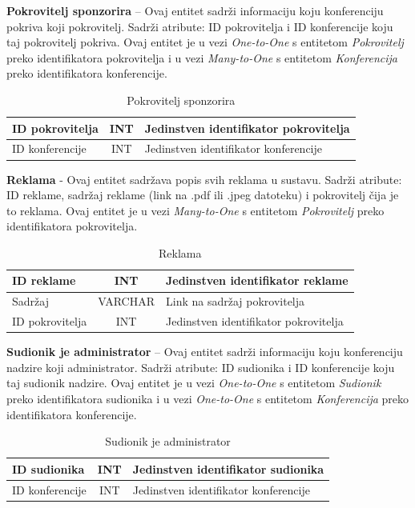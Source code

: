 \textbf{Pokrovitelj sponzorira} – Ovaj entitet sadrži informaciju koju konferenciju pokriva koji pokrovitelj. Sadrži atribute: ID pokrovitelja i ID konferencije koju taj pokrovitelj pokriva. Ovaj entitet je u vezi \textit{One-to-One} s entitetom \textit{Pokrovitelj} preko identifikatora pokrovitelja i u vezi \textit{Many-to-One} s entitetom \textit{Konferencija} preko identifikatora konferencije.

\begin{table}[H]
	\caption{Pokrovitelj sponzorira}
	\label{tbl:pokroviteljSponzorira}
	\centering
	\begin{tabular}{|l|c|l|} 
		\hline
		\cellcolor{lightblue}ID pokrovitelja & INT & Jedinstven identifikator pokrovitelja\\ 
		\hline
		\cellcolor{lightblue}ID konferencije & INT & Jedinstven identifikator konferencije\\ 
		\hline
	\end{tabular}
\end{table}

\textbf{Reklama} - Ovaj entitet sadržava popis svih reklama u sustavu. Sadrži atribute: ID reklame, sadržaj reklame (link na .pdf ili .jpeg datoteku) i pokrovitelj čija je to reklama. Ovaj entitet je u vezi \textit{Many-to-One} s entitetom \textit{Pokrovitelj} preko identifikatora pokrovitelja.

\begin{table}[H]
	\caption{Reklama}
	\label{tbl:reklama}
	\centering
	\begin{tabular}{|l|c|l|} 
		\hline
		\cellcolor{lightgreen}ID reklame & INT & Jedinstven identifikator reklame\\ 
		\hline
		Sadržaj & VARCHAR & Link na sadržaj pokrovitelja\\ 
		\hline
		\cellcolor{lightblue}ID pokrovitelja & INT & Jedinstven identifikator pokrovitelja\\ 
		\hline
	\end{tabular}
\end{table}

\textbf{Sudionik je administrator} – Ovaj entitet sadrži informaciju koju konferenciju nadzire koji administrator. Sadrži atribute: ID sudionika i ID konferencije koju taj sudionik nadzire. Ovaj entitet je u vezi \textit{One-to-One} s entitetom \textit{Sudionik} preko identifikatora sudionika i u vezi \textit{One-to-One} s entitetom \textit{Konferencija} preko identifikatora konferencije.

\begin{table}[H]
	\caption{Sudionik je administrator}
	\label{tbl:sudionikJeAdministrator}
	\centering
	\begin{tabular}{|l|c|l|} 
		\hline
		\cellcolor{lightblue}ID sudionika & INT & Jedinstven identifikator sudionika\\ 
		\hline
		\cellcolor{lightblue}ID konferencije & INT & Jedinstven identifikator konferencije\\ 
		\hline
	\end{tabular}
\end{table}

